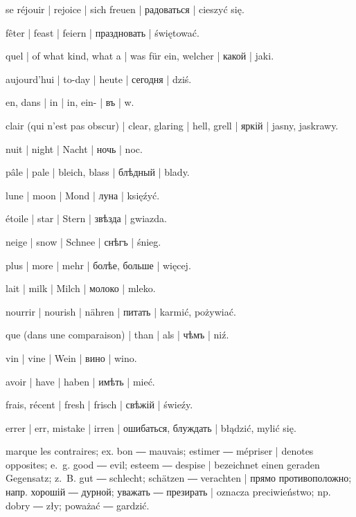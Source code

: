 \begin{ekzvocab}{1em}
 se réjouir | rejoice | sich freuen | радоваться | cieszyć się.

 fêter | feast | feiern | праздновать | świętować.

 quel | of what kind, what a | was für ein, welcher | какой | jaki.

 aujourd’hui | to-day | heute | сегодня | dziś.

 en, dans | in | in, ein- | въ | w.

 clair (qui n’est pas obscur) | clear, glaring | hell, grell | яркій | jasny, jaskrawy.

 nuit | night | Nacht | ночь | noc.

 pâle | pale | bleich, blass | блѣдный | blady.

 lune | moon | Mond | луна | księźyć.

 étoile | star | Stern | звѣзда | gwiazda.

 neige | snow | Schnee | снѣгъ | śnieg.

 plus | more | mehr | болѣе, больше | więcej.

 lait | milk | Milch | молоко | mleko.

 nourrir | nourish | nähren | питать | karmić, pożywiać.

 que (dans une comparaison) | than | als | чѣмъ | niź.

 vin | vine | Wein | вино | wino.

 avoir | have | haben | имѣть | mieć.

 frais, récent | fresh | frisch | свѣжій | świeźy.

 errer | err, mistake | irren | ошибаться, блуждать | błądzić, mylić się.

 marque les contraires; ex.  bon ―  mauvais;  estimer ―  mépriser | denotes opposites; e.~g.  good ―  evil;  esteem ―  despise | bezeichnet einen geraden Gegensatz; z.~B.  gut ―  schlecht;  schätzen ―  verachten | прямо противоположно; напр.  хорошій ―  дурной;  уважать ―  презирать | oznacza preciwieństwo; np.  dobry ―  zły;  poważać ―  gardzić.


\end{ekzvocab}

